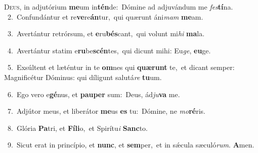 \lettrine{\initial\textcolor{\initialcolor}{D}}{eus,} in adjutórium \textbf{me}\-um in\-\textbf{tén}\-de:~\star Dómine ad adjuvándum me \textit{fes}\-\textbf{tí}na.\\
{\numbfont\textcolor{\numbcolor}{~2.}}~Confundántur et re\-\textbf{ve}\-re\-\textbf{án}\-tur,~\star qui quærunt áni\textit{mam} \textbf{me}\-am.\par
{\numbfont\textcolor{\numbcolor}{~3.}}~Avertántur retrórsum, et \textbf{e}\-ru\-\textbf{bés}\-cant,~\star qui volunt mi\textit{hi} \textbf{ma}\-la.\par
{\numbfont\textcolor{\numbcolor}{~4.}}~Avertántur statim e\-\textbf{ru}\-be\-\textbf{scén}\-tes,~\star qui dicunt mihi: Eu\-\textit{ge}\-, \textbf{eu}\-ge.\par
{\numbfont\textcolor{\numbcolor}{~5.}}~Exsúltent et læténtur in te \textbf{om}\-nes qui \textbf{quæ}\-\textbf{runt} te,~\star et dicant semper: Magnificétur Dóminus: qui díligunt salutá\textit{re} \textbf{tu}\-um.\par
{\numbfont\textcolor{\numbcolor}{~6.}}~Ego vero e\-\textbf{gé}\-nus, et \textbf{pau}\-\textbf{per} sum:~\star Deus, ád\-\textit{ju}\-\textbf{va} me.\par
{\numbfont\textcolor{\numbcolor}{~7.}}~Adjútor meus, et liberátor \textbf{me}\-us \textbf{es} tu:~\star Dómine, ne \textit{mo}\-\textbf{ré}ris.\par
{\numbfont\textcolor{\numbcolor}{~8.}}~Glória \textbf{Pa}\-tri, et \textbf{Fí}\-\textbf{li}o,~\star et Spirítu\textit{i} \textbf{Sanc}\-to.\par
{\numbfont\textcolor{\numbcolor}{~9.}}~Sicut erat in princípio, et \textbf{nunc}\-, et \textbf{sem}\-per,~\star et in sǽcula sæculó\-\textit{rum}\-. \textbf{A}\-men.\par
